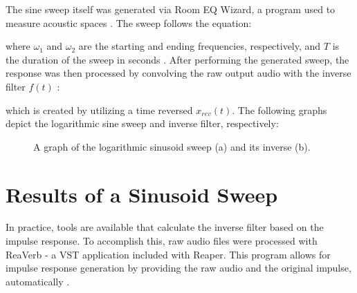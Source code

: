 The sine sweep itself was generated via Room EQ Wizard, a program used to measure acoustic spaces \cite{REW}. The sweep follows the equation:

\begin{center}
\end{center}

where $\omega_1$ and $\omega_2$ are the starting and ending frequencies, respectively, and $T$ is the duration of the sweep in seconds \cite{farina2000simultaneous}. After performing the generated sweep, the response was then processed by convolving the raw output audio with the inverse filter $f(t)$ \cite{inversecalc}:

\begin{center}
\end{center}

which is created by utilizing a time reversed $x_{rev}(t)$. The following graphs depict the logarithmic sine sweep and inverse filter, respectively:


\begin{figure}[h]
\caption{A graph of the logarithmic sinusoid sweep (a) and its inverse (b).}
\end{figure}

\section{Results of a Sinusoid Sweep}

In practice, tools are available that calculate the inverse filter based on the impulse response. To accomplish this, raw audio files were processed with ReaVerb - a VST application included with Reaper. This program allows for impulse response generation by providing the raw audio and the original impulse, automatically .
